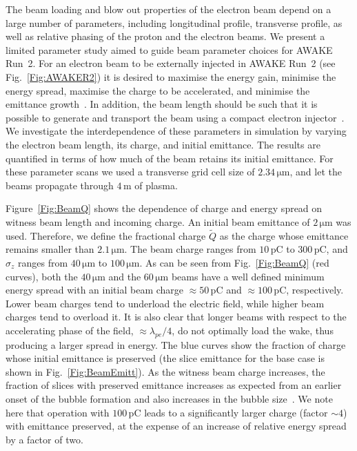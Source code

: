 \documentclass[aps,prstab,reprint,amsmath,amssymb,groupedaddress]{revtex4-1}
\newcommand{\unit}[1]{\,\mathrm{#1}}
\begin{document}
The beam loading and blow out properties of the electron beam depend on a large number of parameters, including longitudinal profile, transverse profile, as well as relative phasing of the proton and the electron beams. We present a limited parameter study aimed to guide beam parameter choices for AWAKE Run~2. For an electron beam to be externally injected in AWAKE Run~2 (see Fig.~\ref{Fig:AWAKER2}) it is desired to maximise the energy gain, minimise the energy spread, maximise the charge to be accelerated, and minimise the emittance growth~\cite{adli:2016}. In addition, the beam length should be such that it is possible to generate and transport the beam using a compact electron injector~\cite{adli:2016}. We investigate the interdependence of these parameters in simulation by varying the electron beam length, its charge, and initial emittance. The results are quantified in terms of how much of the beam retains its initial emittance. For these parameter scans we used a transverse grid cell size of $2.34\unit{\mu m}$, and let the beams propagate through $4\unit{m}$ of plasma.

Figure~\ref{Fig:BeamQ} shows the dependence of charge and energy spread on witness beam length and incoming charge. An initial beam emittance of $2\unit{\mu m}$ was used. Therefore, we define the fractional charge $\widetilde{Q}$ as the charge whose emittance remains smaller than $2.1\unit{\mu m}$. The beam charge ranges from $10\unit{pC}$ to $300\unit{pC}$, and $\sigma_{z}$ ranges from $40\unit{\mu m}$ to $100\unit{\mu m}$. As can be seen from Fig.~\ref{Fig:BeamQ} (red curves), both the $40\unit{\mu m}$ and the $60\unit{\mu m}$ beams have a well defined minimum energy spread with an initial beam charge $\approx 50\unit{pC}$ and $\approx 100\unit{pC}$, respectively. Lower beam charges tend to underload the electric field, while higher beam charges tend to overload it. It is also clear that longer beams with respect to the accelerating phase of the field, $\approx\lambda_{pe}/4$, do not optimally load the wake, thus producing a larger spread in energy. The blue curves show the fraction of charge whose initial emittance is preserved (the slice emittance for the base case is shown in Fig.~\ref{Fig:BeamEmitt}). As the witness beam charge increases, the fraction of slices with preserved emittance increases \textendash as expected from an earlier onset of the bubble formation \textendash and also increases in the bubble size~\cite{lu:2006-1, lu:2006}. We note here that operation with $100\unit{pC}$ leads to a significantly larger charge (factor $\sim 4$) with emittance preserved, at the expense of an increase of relative energy spread by a factor of two.
\end{document}
